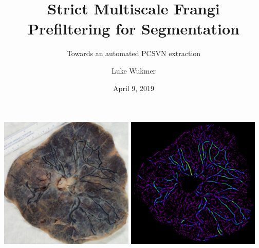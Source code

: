 \documentclass[9pt]{beamer}
\title[Cake Defense]{Strict Multiscale Frangi Prefiltering for Segmentation}
\subtitle{Towards an automated PCSVN extraction}
\author[{Luke Wukmer}] %
{{Luke Wukmer}}%
\institute[CSULB] %
{
  Advisor: Dr. Jen-Mei Chang\\
  Department of Mathematics and Statistics\\
  California State University, Long Beach\\
  \texttt{lwukmer@gmail.com}
}
\date{April 9, 2019}
\begin{document}
\begin{frame} %
  \titlepage
\end{frame}

\begin{frame}
\includegraphics[width=0.48\textwidth]{BN0651415-cropped_cimg}
\includegraphics[width=0.48\textwidth]{BN0651415-Vsigma-18-unscaled.png}
\end{frame}
\end{document}
